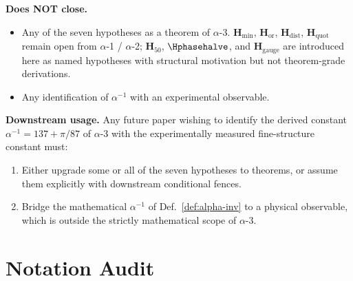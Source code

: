 \documentclass[11pt, a4paper]{amsart}
\theoremstyle{definition}
\newcommand{\Hmin}{\mathbf{H}_{\min}}
\newcommand{\Hor}{\mathbf{H}_{\mathrm{or}}}
\newcommand{\Hdist}{\mathbf{H}_{\mathrm{dist}}}
\newcommand{\Hquot}{\mathbf{H}_{\mathrm{quot}}}
\newcommand{\Hfifty}{\mathbf{H}_{50}}
\newcommand{\Hgauge}{\mathbf{H}_{\mathrm{gauge}}}
\begin{document}
\textbf{Does NOT close.}
\begin{itemize}
\item Any of the seven hypotheses as a theorem of $\alpha$-3.
  $\Hmin$, $\Hor$, $\Hdist$, $\Hquot$ remain open from
  $\alpha$-1 / $\alpha$-2; $\Hfifty$, $\Hphasehalve$, and
  $\Hgauge$ are introduced here as named hypotheses with
  structural motivation but not theorem-grade derivations.
\item Any identification of $\alpha^{-1}$ with an
  experimental observable.
\end{itemize}

\textbf{Downstream usage.} Any future paper wishing to
identify the derived constant $\alpha^{-1} = 137 + \pi/87$
of $\alpha$-3 with the experimentally measured fine-structure
constant must:
\begin{enumerate}
\item Either upgrade some or all of the seven hypotheses to
  theorems, or assume them explicitly with downstream
  conditional fences.
\item Bridge the mathematical $\alpha^{-1}$ of
  Def.~\ref{def:alpha-inv} to a physical observable, which
  is outside the strictly mathematical scope of $\alpha$-3.
\end{enumerate}

\section{Notation Audit}
\label{sec:notation}
\end{document}
